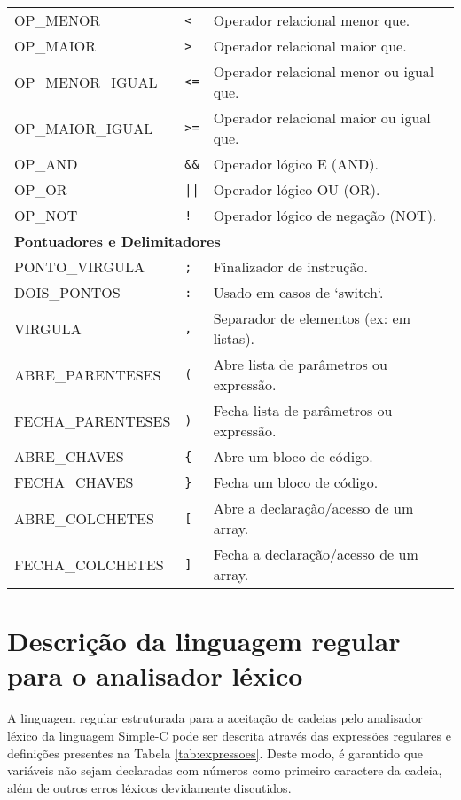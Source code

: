 \documentclass[12pt,a4paper]{article}
\begin{document}
\begin{longtable}{lll}
OP\_MENOR & \texttt{<} & Operador relacional menor que. \\
OP\_MAIOR & \texttt{>} & Operador relacional maior que. \\
OP\_MENOR\_IGUAL & \texttt{<=} & Operador relacional menor ou igual que. \\
OP\_MAIOR\_IGUAL & \texttt{>=} & Operador relacional maior ou igual que. \\
OP\_AND & \texttt{\&\&} & Operador lógico E (AND). \\
OP\_OR & \texttt{||} & Operador lógico OU (OR). \\
OP\_NOT & \texttt{!} & Operador lógico de negação (NOT). \\
\midrule
\multicolumn{3}{l}{\textbf{Pontuadores e Delimitadores}} \\
\midrule
PONTO\_VIRGULA & \texttt{;} & Finalizador de instrução. \\
DOIS\_PONTOS & \texttt{:} & Usado em casos de `switch`. \\
VIRGULA & \texttt{,} & Separador de elementos (ex: em listas). \\
ABRE\_PARENTESES & \texttt{(} & Abre lista de parâmetros ou expressão. \\
FECHA\_PARENTESES & \texttt{)} & Fecha lista de parâmetros ou expressão. \\
ABRE\_CHAVES & \texttt{\{} & Abre um bloco de código. \\
FECHA\_CHAVES & \texttt{\}} & Fecha um bloco de código. \\
ABRE\_COLCHETES & \texttt{[} & Abre a declaração/acesso de um array. \\
FECHA\_COLCHETES & \texttt{]} & Fecha a declaração/acesso de um array. \\
\end{longtable}


\section{Descrição da linguagem regular para o analisador léxico}
\label{sec:desc}

A linguagem regular estruturada para a aceitação de cadeias pelo analisador léxico da linguagem Simple-C pode ser descrita através das expressões regulares e definições presentes na Tabela \ref{tab:expressoes}. Deste modo, é garantido que variáveis não sejam declaradas com números como primeiro caractere da cadeia, além de outros erros léxicos devidamente discutidos.
\end{document}

